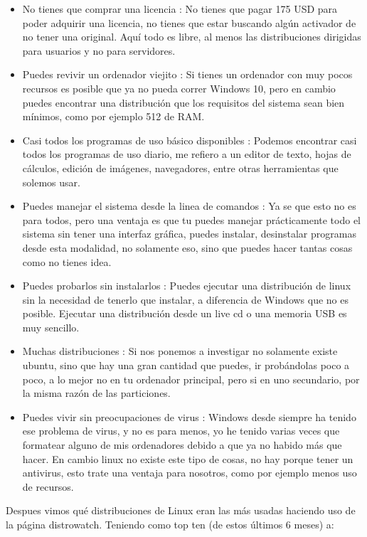 \documentclass[11pt, a4paper]{report}
\begin{document}
\begin{itemize}
\item No tienes que comprar una licencia : No tienes que pagar 175 USD
  para poder adquirir una licencia, no tienes que estar buscando algún
  activador de no tener una original. Aquí todo es libre, al menos las
  distribuciones dirigidas para usuarios y no para servidores.
\item  Puedes revivir un ordenador viejito : Si tienes un ordenador con
  muy pocos recursos es posible que ya no pueda correr Windows 10, pero
  en cambio puedes encontrar una distribución que los requisitos del
  sistema sean bien mínimos, como por ejemplo 512 de RAM.
\item Casi todos los programas de uso básico disponibles : Podemos
  encontrar casi todos los programas de uso diario, me refiero a un
  editor de texto, hojas de cálculos, edición de imágenes, navegadores,
  entre otras herramientas que solemos usar.
\item Puedes manejar el sistema desde la linea de comandos : Ya se que
  esto no es para todos, pero una ventaja es que tu puedes manejar
  prácticamente todo el sistema sin tener una interfaz gráfica, puedes
  instalar, desinstalar programas desde esta modalidad, no solamente eso,
  sino que puedes hacer tantas cosas como no tienes idea.
\item Puedes probarlos sin instalarlos : Puedes ejecutar una distribución
  de linux sin la necesidad de tenerlo que instalar, a diferencia de
  Windows que no es posible. Ejecutar una distribución desde un live cd o
  una memoria USB es muy sencillo.
\item Muchas distribuciones : Si nos ponemos a investigar no solamente
  existe ubuntu, sino que hay una gran cantidad que puedes, ir
  probándolas poco a poco, a lo mejor no en tu ordenador principal, pero
  si en uno secundario, por la misma razón de las particiones.
\item Puedes vivir sin preocupaciones de virus : Windows desde siempre ha
  tenido ese problema de virus, y no es para menos, yo he tenido varias
  veces que formatear alguno de mis ordenadores debido a que ya no habido
  más que hacer. En cambio linux no existe este tipo de cosas, no hay
  porque tener un antivirus, esto trate una ventaja para nosotros, como
  por ejemplo menos uso de recursos.
\end{itemize}


Despues vimos qué distribuciones de Linux eran las más usadas haciendo uso
de la página distrowatch. Teniendo como top ten
(de estos últimos 6 meses) a:
\end{document}
